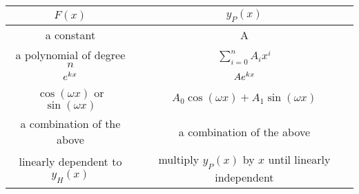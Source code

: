 \documentclass{article}
\begin{document}
\begin{table}[H]
    \centering
    \begin{tabular}{c | c}
        \toprule
        $F(x)$                                                             & $y_P(x)$                                                                \\
        \midrule
        a constant                                                         & A                                                                       \\
        a polynomial of degree $n$                                         & $\displaystyle \sum_{i = 0}^n A_i x^i$                                  \\
        $e^{kx}$                                                          & $A e^{kx}$                                                             \\
        $\cos{\left( \omega x \right)}$ or $\sin{\left( \omega x \right)}$ & $A_0 \cos{\left( \omega x \right)} + A_1 \sin{\left( \omega x \right)}$ \\
        a combination of the above                                         & a combination of the above                                              \\
        linearly dependent to $y_H(x)$                                     & multiply $y_P(x)$ by $x$ until linearly independent                     \\
        \bottomrule
    \end{tabular}
\end{table}
\end{document}
